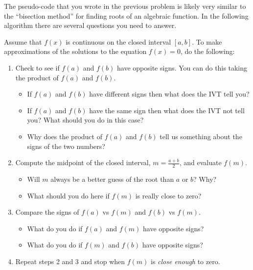 The pseudo-code that you wrote in the previous problem is likely very similar to the
``bisection method'' for finding roots of an algebraic function.  In the following
algorithm there are several questions you need to answer.
\begin{algorithm}
    Assume that $f(x)$ is continuous on the closed interval $[a,b]$. To make approximations of
    the solutions to the equation $f(x) = 0$, do the following:
    \begin{enumerate}
        \item Check to see if $f(a)$ and $f(b)$ have opposite signs.  You can do this
            taking the product of $f(a)$ and $f(b)$.
            \begin{itemize}
                \item If $f(a)$ and $f(b)$ have different signs then what does the IVT
                    tell you?
                \item If $f(a)$ and $f(b)$ have the same sign then what does the IVT not
                    tell you? What should you do in this case?
                \item Why does the product of $f(a)$ and $f(b)$ tell us something about
                    the signs of the two numbers?
            \end{itemize}
            
        \item Compute the midpoint of the closed interval, $m=\frac{a+b}{2}$, and evaluate
            $f(m)$. 
            \begin{itemize}
                \item Will $m$ always be a better guess of the root than $a$ or $b$?  Why?
                \item What should you do here if $f(m)$ is really close to zero?
            \end{itemize}
        \item Compare the signs of $f(a)$ vs $f(m)$ and $f(b)$ vs $f(m)$.  
            \begin{itemize}
                \item What do you do if $f(a)$ and $f(m)$ have opposite signs?
                \item What do you do if $f(m)$ and $f(b)$ have opposite signs?
            \end{itemize}

        \item Repeat steps 2 and 3 and stop when $f(m)$ is {\it close enough} to zero.
    \end{enumerate}
\end{algorithm}

